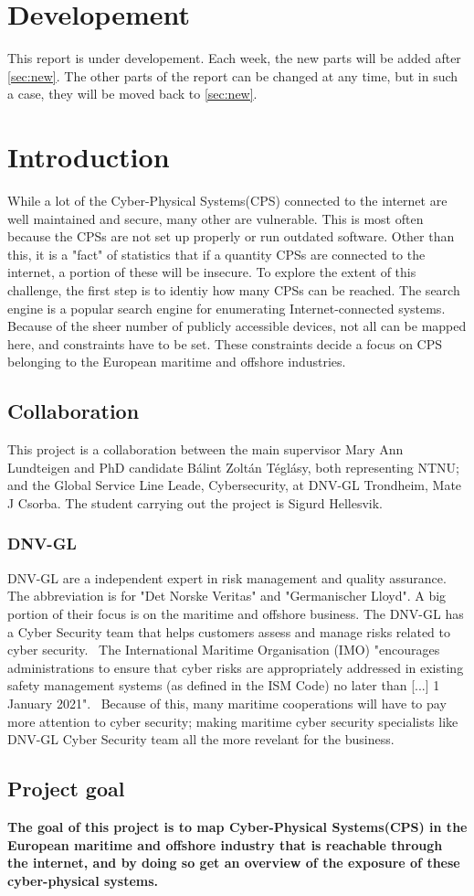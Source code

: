 \section{Developement}
This report is under developement. Each week, the new parts will be added after \cref{sec:new}. The other parts of the report can be changed at any time, but in such a case, they will be moved back to \cref{sec:new}.


\section{Introduction} \label{sec:intro}
While a lot of the Cyber-Physical Systems(CPS) connected to the internet are well maintained and secure, many other are vulnerable. This is most often because the CPSs are not set up properly or run outdated software. Other than this, it is a "fact" of statistics that if a quantity CPSs are connected to the internet, a portion of these will be insecure. To explore the extent of this challenge, the first step is to identiy how many CPSs can be reached. The search engine \href{https://shodan.io}{\color{blue}{Shodan}} is a popular search engine for enumerating Internet-connected systems. Because of the sheer number of  publicly accessible devices, not all can be mapped here, and constraints have to be set. These constraints decide a focus on CPS belonging to the European maritime and offshore industries.

\subsection{Collaboration}\label{sec:collaboration}
This project is a collaboration between the main supervisor Mary Ann Lundteigen and PhD candidate Bálint Zoltán Téglásy, both representing NTNU; and the Global Service Line Leade, Cybersecurity, at DNV-GL Trondheim,  Mate J Csorba. The student carrying out the project is Sigurd Hellesvik.

\subsubsection{DNV-GL}\label{sec:dnvgl}
DNV-GL are a independent expert in risk management and quality assurance. The abbreviation is for "Det Norske Veritas" and "Germanischer Lloyd". A big portion of their focus is on the maritime and offshore business. The DNV-GL has a Cyber Security team that helps customers assess and manage risks related to cyber security.~\cite{DNVGL_cybersec}  The International Maritime Organisation (IMO) "encourages administrations to ensure that cyber risks are appropriately addressed in existing safety management systems (as defined in the ISM Code) no later than [...] 1 January 2021".~\cite{IMO_2021} Because of this, many maritime cooperations will have to pay more attention to cyber security; making maritime cyber security specialists like DNV-GL Cyber Security team all the more revelant for the business. 

\subsection{Project goal}\label{sec:goal}
\textbf{The goal of this project is to map Cyber-Physical Systems(CPS) in the European maritime and offshore industry that is reachable through the internet, and by doing so get an overview of the exposure of these cyber-physical systems.}



